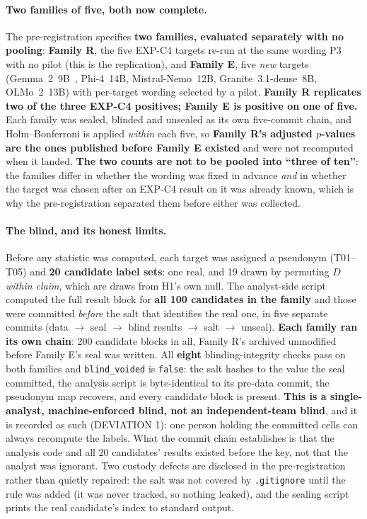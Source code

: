 \paragraph{Two families of five, both now complete.} The pre-registration specifies \textbf{two families, evaluated separately with no pooling}: \textbf{Family R}, the five EXP-C4 targets re-run at the same wording P3 with no pilot (this is the replication), and \textbf{Family E}, five \emph{new} targets (Gemma~2~9B~\citep{team2024gemma2}, Phi-4~14B, Mistral-Nemo~12B, Granite~3.1-dense~8B, OLMo~2~13B) with per-target wording selected by a pilot. \textbf{Family R replicates two of the three EXP-C4 positives; Family E is positive on one of five.} Each family was sealed, blinded and unsealed as its own five-commit chain, and Holm--Bonferroni is applied \emph{within} each five, so \textbf{Family R's adjusted $p$-values are the ones published before Family E existed} and were not recomputed when it landed. \textbf{The two counts are not to be pooled into ``three of ten''}: the families differ in whether the wording was fixed in advance \emph{and} in whether the target was chosen after an EXP-C4 result on it was already known, which is why the pre-registration separated them before either was collected.

\paragraph{The blind, and its honest limits.} Before any statistic was computed, each target was assigned a pseudonym (T01--T05) and \textbf{20 candidate label sets}: one real, and 19 drawn by permuting $D$ \emph{within claim}, which are draws from H1's own null. The analyst-side script computed the full result block for \textbf{all 100 candidates in the family} and those were committed \emph{before} the salt that identifies the real one, in five separate commits (data $\to$ seal $\to$ blind results $\to$ salt $\to$ unseal). \textbf{Each family ran its own chain}: 200 candidate blocks in all, Family R's archived unmodified before Family E's seal was written. All \textbf{eight} blinding-integrity checks pass on both families and \texttt{blind\_voided} is \texttt{false}: the salt hashes to the value the seal committed, the analysis script is byte-identical to its pre-data commit, the pseudonym map recovers, and every candidate block is present. \textbf{This is a single-analyst, machine-enforced blind, not an independent-team blind}, and it is recorded as such (DEVIATION 1): one person holding the committed cells can always recompute the labels. What the commit chain establishes is that the analysis code and all 20 candidates' results existed before the key, not that the analyst was ignorant. Two custody defects are disclosed in the pre-registration rather than quietly repaired: the salt was not covered by \texttt{.gitignore} until the rule was added (it was never tracked, so nothing leaked), and the sealing script prints the real candidate's index to standard output.

